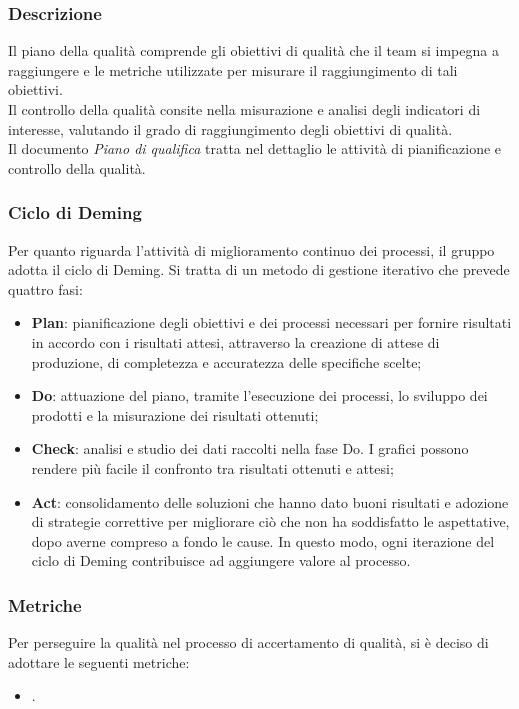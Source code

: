 \subsubsection{Descrizione}
Il piano della qualità comprende gli obiettivi di qualità che il team si
impegna a raggiungere e le metriche utilizzate per misurare il raggiungimento
di tali obiettivi. \\ Il controllo della qualità consite nella misurazione e
analisi degli indicatori di interesse, valutando il grado di raggiungimento
degli obiettivi di qualità. \\ Il documento \textit{Piano di qualifica} tratta
nel dettaglio le attività di pianificazione e controllo della qualità. \\
\subsubsection{Ciclo di Deming}
Per quanto riguarda l'attività di miglioramento continuo dei processi, il
gruppo adotta il ciclo di Deming. Si tratta di un metodo di gestione iterativo
che prevede quattro fasi:
\begin{itemize}
      \item \textbf{Plan}: pianificazione degli obiettivi e dei processi necessari per fornire
            risultati in accordo con i risultati attesi, attraverso la creazione di attese di
            produzione, di completezza e accuratezza delle specifiche scelte;
      \item \textbf{Do}: attuazione del piano, tramite l'esecuzione dei processi,
            lo sviluppo dei prodotti e la misurazione dei risultati ottenuti;
      \item \textbf{Check}: analisi e studio dei dati raccolti nella fase Do.
            I grafici possono rendere più facile il confronto tra risultati ottenuti e attesi;
      \item \textbf{Act}: consolidamento delle soluzioni che hanno dato buoni risultati e
            adozione di strategie correttive per migliorare ciò che non ha soddisfatto le aspettative,
            dopo averne compreso a fondo le cause. In questo modo, ogni iterazione del ciclo di Deming
            contribuisce ad aggiungere valore al processo.
\end{itemize}
\subsubsection{Metriche}
Per perseguire la qualità nel processo di accertamento di qualità, si è deciso
di adottare le seguenti metriche:
\begin{itemize}
      \item {}.
\end{itemize}
